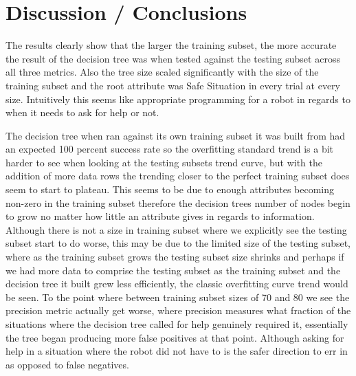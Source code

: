 \documentclass[conference]{IEEEtran}
\begin{document}
\section{Discussion / Conclusions}
    The results clearly show that the larger the training subset, the more accurate the result of the decision tree was when tested against the testing subset across all three metrics. Also the tree size scaled significantly with the size of the training subset and the root attribute was Safe Situation in every trial at every size. Intuitively this seems like appropriate programming for a robot in regards to when it needs to ask for help or not. 

    The decision tree when ran against its own training subset it was built from had an expected 100 percent success rate so the overfitting standard trend is a bit harder to see when looking at the testing subsets trend curve, but with the addition of more data rows the trending closer to the perfect training subset does seem to start to plateau. This seems to be due to enough attributes becoming non-zero in the training subset therefore the decision trees number of nodes begin to grow no matter how little an attribute gives in regards to information. Although there is not a size in training subset where we explicitly see the testing subset start to do worse, this may be due to the limited size of the testing subset, where as the training subset grows the testing subset size shrinks and perhaps if we had more data to comprise the testing subset as the training subset and the decision tree it built grew less efficiently, the classic overfitting curve trend would be seen. To the point where between training subset sizes of 70 and 80 we see the precision metric actually get worse, where precision measures what fraction of the situations where the decision tree called for help genuinely required it, essentially the tree began producing more false positives at that point. Although asking for help in a situation where the robot did not have to is the safer direction to err in as opposed to false negatives.
\end{document}
